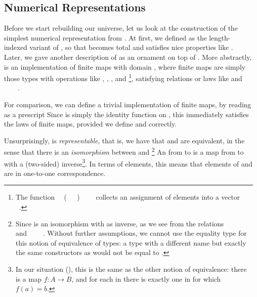 \subsection{Numerical Representations}\label{sec:desc-numrep}
Before we start rebuilding our universe, let us look at the construction of the simplest numerical representation  from \bN{}. At first, we defined  as the length-indexed variant of , so that  becomes total and satisfies nice properties like . Later, we gave another description of  as an ornament on top of . More abstractly,  is an implementation of finite maps with domain , where finite maps are simply those types with operations like , , , and \footnote{The function \ \AV{:}\ (\ \ \ )\ \ \ \  collects an assignment of elements  into a vector \ .}, satisfying relations or laws like  and \ \ \ \ .  

For comparison, we can define a trivial implementation of finite maps, by reading  as a prescript
Since  is simply the identity function on , this immediately satisfies the laws of finite maps, provided we define  and  correctly.

Unsurprisingly,  is \emph{representable}, that is, we have that  and  are equivalent, in the sense that there is an \emph{isomorphism} between  and \footnote{Since  is an isomorphism with  as inverse, as we see from the relations \ \ \ \  and  \ \ \ \ . Without further assumptions, we cannot use the equality type  for this notion of equivalence of types: a type with a different name but exactly the same constructors as  would not be equal to .}
An  from  to  is a map from  to  with a (two-sided) inverse\footnote{In our situation (), this is the same as the other notion of equivalence: there is a map $f : A \to B$, and for each  in  there is exactly one  in  for which $f(a) = b$.}. In terms of elements, this means that elements of  and  are in one-to-one correspondence.


